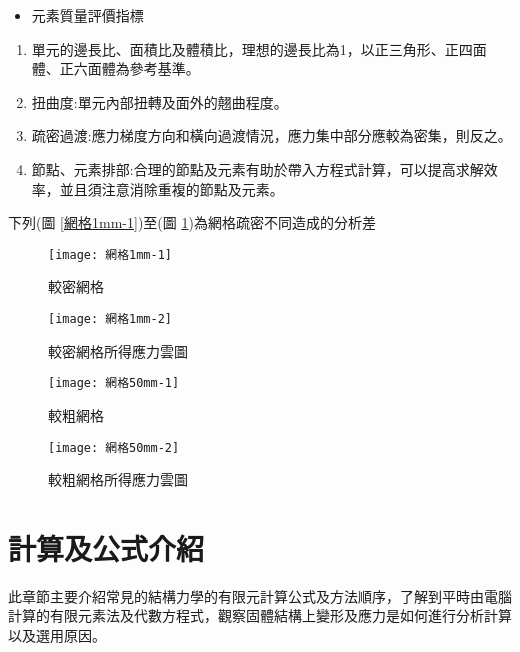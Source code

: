 \begin{itemize}
\item 元素質量評價指標
\end{itemize}

\begin{enumerate}
\item 單元的邊長比、面積比及體積比，理想的邊長比為1，以正三角形、正四面體、正六面體為參考基準。
\item 扭曲度:單元內部扭轉及面外的翹曲程度。
\item 疏密過渡:應力梯度方向和橫向過渡情況，應力集中部分應較為密集，則反之。
\item 節點、元素排部:合理的節點及元素有助於帶入方程式計算，可以提高求解效率，並且須注意消除重複的節點及元素。
\end{enumerate}
下列(圖 \ref{網格1mm-1})至(圖 \ref{網格50mm-2})為網格疏密不同造成的分析差\

\begin{figure}[htbp]
  \centering
  \begin{minipage}{0.45\textwidth}
    \centering
    \texttt{[image: 網格1mm-1]}
    \caption{較密網格}
    \label{網格1mm-1}
  \end{minipage}
  \hfill
  \begin{minipage}{0.45\textwidth}
    \centering
    \texttt{[image: 網格1mm-2]}
    \caption{較密網格所得應力雲圖}
    \label{網格1mm-2}
  \end{minipage}
  
  \vspace{0.75cm} %
  
  \begin{minipage}{0.45\textwidth}
    \centering
    \texttt{[image: 網格50mm-1]}
    \caption{較粗網格}
    \label{網格50mm-1}
  \end{minipage}
  \hfill
  \begin{minipage}{0.45\textwidth}
    \centering
    \texttt{[image: 網格50mm-2]}
    \caption{較粗網格所得應力雲圖}
    \label{網格50mm-2}
  \end{minipage}
\end{figure}
\newpage

\section{計算及公式介紹}
此章節主要介紹常見的結構力學的有限元計算公式及方法順序，了解到平時由電腦計算的有限元素法及代數方程式，觀察固體結構上變形及應力是如何進行分析計算以及選用原因。\\

